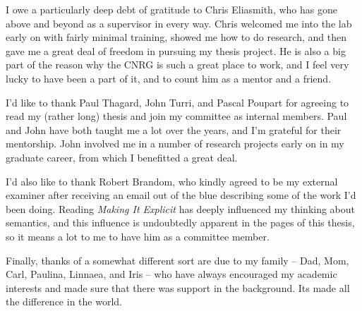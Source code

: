 I owe a particularly deep debt of gratitude to Chris Eliasmith, who has gone above and beyond as a supervisor in every way. Chris welcomed me into the lab early on with fairly minimal training, showed me how to do research, and then gave me a great deal of freedom in pursuing my thesis project. He is also a big part of the reason why the CNRG is such a great place to work, and I feel very lucky to have been a part of it, and to count him as a mentor and a friend.

I'd like to thank Paul Thagard, John Turri, and Pascal Poupart for agreeing to read my (rather long) thesis and join my committee as internal members. Paul and John have both taught me a lot over the years, and I'm grateful for their mentorship. John involved me in a number of research projects early on in my graduate career, from which I benefitted a great deal.

I'd also like to thank Robert Brandom, who kindly agreed to be my external examiner after receiving an email out of the blue describing some of the work I'd been doing. Reading \textit{Making It Explicit} has deeply influenced my thinking about semantics, and this influence is undoubtedly apparent in the pages of this thesis, so it means a lot to me to have him as a committee member. 

Finally, thanks of a somewhat different sort are due to my family -- Dad, Mom, Carl, Paulina, Linnaea, and Iris -- who have always encouraged my academic interests and made sure that there was support in the background. Its made all the difference in the world. 

\cleardoublepage

\renewcommand\contentsname{Table of Contents}
\tableofcontents
\cleardoublepage
{}    %

\listoftables
\cleardoublepage
{}		%

\listoffigures
\cleardoublepage
{}		%



